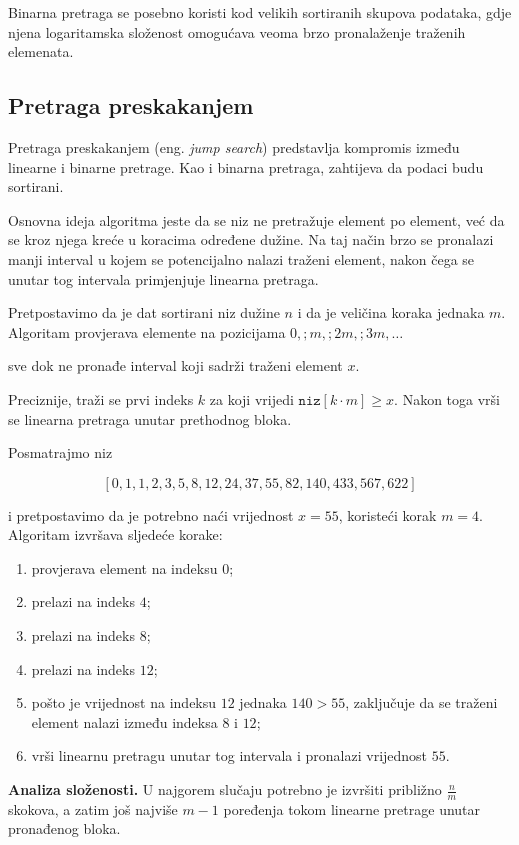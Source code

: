 Binarna pretraga se posebno koristi kod velikih sortiranih skupova podataka, gdje njena logaritamska složenost omogućava veoma brzo pronalaženje traženih elemenata.

\subsection{Pretraga preskakanjem}

Pretraga preskakanjem (eng. \emph{jump search}) predstavlja kompromis između linearne i binarne pretrage. Kao i binarna pretraga, zahtijeva da podaci budu sortirani.

Osnovna ideja algoritma jeste da se niz ne pretražuje element po element, već da se kroz njega kreće u koracima određene dužine. Na taj način brzo se pronalazi manji interval u kojem se potencijalno nalazi traženi element, nakon čega se unutar tog intervala primjenjuje linearna pretraga.

Pretpostavimo da je dat sortirani niz dužine $n$ i da je veličina koraka jednaka $m$. Algoritam provjerava elemente na pozicijama $0,; m,; 2m,; 3m,\ldots$

sve dok ne pronađe interval koji sadrži traženi element $x$.

Preciznije, traži se prvi indeks $k$ za koji vrijedi $\texttt{niz}[k \cdot m] \geq x.$ Nakon toga vrši se linearna pretraga unutar prethodnog bloka.

Posmatrajmo niz

$$
[0,1,1,2,3,5,8,12,24,37,55,82,140,433,567,622]$$

i pretpostavimo da je potrebno naći vrijednost $x=55$, koristeći korak $m=4.$ Algoritam izvršava sljedeće korake:

\begin{enumerate}
	\item provjerava element na indeksu $0$;
	\item prelazi na indeks $4$;
	\item prelazi na indeks $8$;
	\item prelazi na indeks $12$;
	\item pošto je vrijednost na indeksu $12$ jednaka $140 > 55$, zaključuje da se traženi element nalazi između indeksa $8$ i $12$;
	\item vrši linearnu pretragu unutar tog intervala i pronalazi vrijednost $55$.
\end{enumerate}

\textbf{Analiza složenosti.} U najgorem slučaju potrebno je izvršiti približno $\frac{n}{m}$ skokova, a zatim još najviše $m-1$ poređenja tokom linearne pretrage unutar pronađenog bloka.

